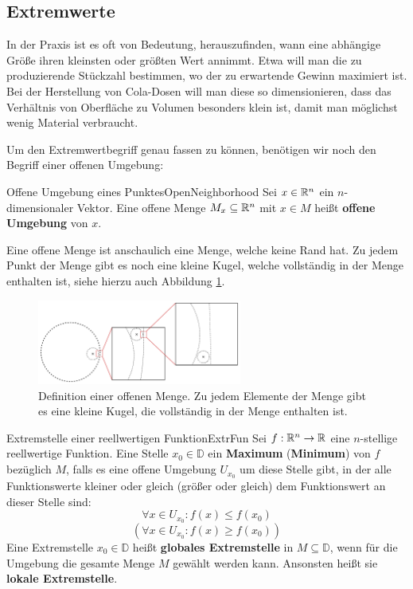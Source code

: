 \subsection{Extremwerte}

In der Praxis ist es oft von Bedeutung, herauszufinden, wann eine abhängige Größe ihren kleinsten oder größten Wert annimmt. Etwa will man die zu produzierende Stückzahl bestimmen, wo der zu erwartende Gewinn maximiert ist. Bei der Herstellung von Cola-Dosen will man diese so dimensionieren, dass das Verhältnis von Oberfläche zu Volumen besonders klein ist, damit man möglichst wenig Material verbraucht.

Um den Extremwertbegriff genau fassen zu können, benötigen wir noch den Begriff einer offenen Umgebung:

\begin{definition}{Offene Umgebung eines Punktes}{OpenNeighborhood}
    Sei $x \in \mathbb{R}^n$ ein $n$-dimensionaler Vektor. Eine offene Menge $M_x \subseteq \mathbb{R}^n$ mit $x\in M$ heißt \textbf{offene Umgebung} von $x$.
\end{definition}

Eine offene Menge ist anschaulich eine Menge, welche keine Rand hat. Zu jedem Punkt der Menge gibt es noch eine kleine Kugel, welche vollständig in der Menge enthalten ist, siehe hierzu auch Abbildung \ref{fig:OpenSet}.

\begin{figure}
    \centering
    \includegraphics[width=0.6\textwidth]{./svg/open-set}
    \caption{Definition einer offenen Menge. Zu jedem Elemente der Menge gibt es eine kleine Kugel, die vollständig in der Menge enthalten ist.}
    \label{fig:OpenSet}
\end{figure}

\begin{definition}{Extremstelle einer reellwertigen Funktion}{ExtrFun}
    Sei $f: \mathbb{R}^n \to \mathbb{R}$ eine $n$-stellige reellwertige Funktion. Eine Stelle $x_0\in\mathbb{D}$ ein \textbf{Maximum} (\textbf{Minimum}) von $f$ bezüglich $M$, falls es eine offene Umgebung $U_{x_0}$ um diese Stelle gibt, in der alle Funktionswerte kleiner oder gleich (größer oder gleich) dem Funktionswert an dieser Stelle sind:
    $$
        \forall x \in U_{x_0}: f(x) \le f(x_0)
    $$
    $$
        (\forall x \in U_{x_0}: f(x) \ge f(x_0))
    $$
    Eine Extremstelle $x_0 \in \mathbb{D}$ heißt \textbf{globales Extremstelle} in $M\subseteq\mathbb{D}$, wenn für die Umgebung die gesamte Menge $M$ gewählt werden kann. Ansonsten heißt sie \textbf{lokale Extremstelle}.
\end{definition}

